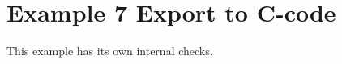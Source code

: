 \documentclass[12pt]{cdblatex}
\begin{document}
\section*{Example 7 Export to C-code}

This example has its own internal checks.
\end{document}
